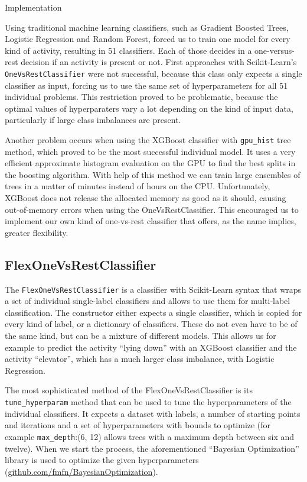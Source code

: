 \begin{section}{Implementation}



Using traditional machine learning classifiers, such as Gradient Boosted Trees, Logistic Regression and Random Forest, forced us to train one model for every kind of activity, resulting in 51 classifiers. Each of those decides in a one-versus-rest decision if an activity is present or not. 
First approaches with Scikit-Learn's \texttt{OneVsRestClassifier} were not successful, because this class only expects a single classifier as input, forcing us to use the same set of hyperparameters for all 51 individual problems. This restriction proved to be problematic, because the optimal values of hyperparaters vary a lot depending on the kind of input data, particularly if large class imbalances are present.

Another problem occurs when using the XGBoost classifier with \texttt{gpu\_hist} tree method, which proved to be the most successful individual model. It uses a very efficient approximate histogram evaluation on the GPU to find the best splits in the boosting algorithm. With help of this method we can train large ensembles of trees in a matter of minutes instead of hours on the CPU. Unfortunately, XGBoost does not release the allocated memory as good as it should, causing out-of-memory errors when using the OneVsRestClassifier.
This encouraged us to implement our own kind of one-vs-rest classifier that offers, as the name implies, greater flexibility. 

\subsection{FlexOneVsRestClassifier}

The \texttt{FlexOneVsRestClassifier} is a classifier with Scikit-Learn syntax that wraps a set of individual single-label classifiers and allows to use them for multi-label classification. The constructor either expects a single classifier, which is copied for every kind of label, or a dictionary of classifiers. These do not even have to be of the same kind, but can be a mixture of different models. This allows us for example to predict the activity \enquote{lying down} with an XGBoost classifier and the activity \enquote{elevator}, which has a much larger class imbalance, with Logistic Regression.

The most sophisticated method of the FlexOneVsRestClassifier is its \texttt{tune\_hyperparam} method that can be used to tune the hyperparameters of the individual classifiers. It expects a dataset with labels, a number of starting points and iterations and a set of hyperparameters with bounds to optimize (for example \texttt{max\_depth}:(6, 12) allows trees with a maximum depth between six and twelve). When we start the process, the aforementioned \enquote{Bayesian Optimization} library is used to optimize the given hyperparameters (\href{https://github.com/fmfn/BayesianOptimization}{github.com/fmfn/BayesianOptimization}).


\end{section}
